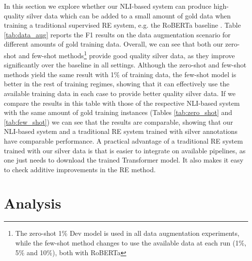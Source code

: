 \documentclass[11pt]{article}
\begin{document}
In this section we explore whether our NLI-based system can produce high-quality silver data which can be added to a small amount of gold data when training a traditional supervised RE system, e.g. the RoBERTa baseline \cite{wang2020kadapter}. 
Table \ref{tab:data_aug} reports the F1 results on the data augmentation scenario for different amounts of gold training data. Overall, we can see that both our zero-shot and few-shot methods\footnote{The zero-shot 1\% Dev model is used in all data augmentation experiments, while the few-shot method changes to use the available data at each run (1\%, 5\% and 10\%), both with RoBERTa} provide good quality silver data, as they improve significantly over the baseline in all settings. Although the zero-shot and few-shot methods yield the same result with 1\% of training data, the few-shot model is better in the rest of training regimes, showing that it can effectively use the available training data in each case to provide better quality silver data. If we compare the results in this table with those of the respective NLI-based system with the same amount of gold training instances (Tables \ref{tab:zero_shot} and \ref{tab:few_shot}) we can see that the results are comparable, showing that our NLI-based system and a traditional RE system trained with silver annotations have comparable performance. A practical advantage of a traditional RE system trained with our silver data is that is easier to integrate on available pipelines, as one just needs to download the trained Transformer model. It also makes it easy to check additive improvements in the RE method.





\section{Analysis}

\begin{table}
    \centering
    \caption{Performance of selected systems and scenarios on two metrics: the binary task of detecting a positive relation vs. no-relation (PvsN column, F1) and detecting the correct relation among positive cases (P, F1).}
    \label{tab:PvsNP}
\end{table}
\end{document}
